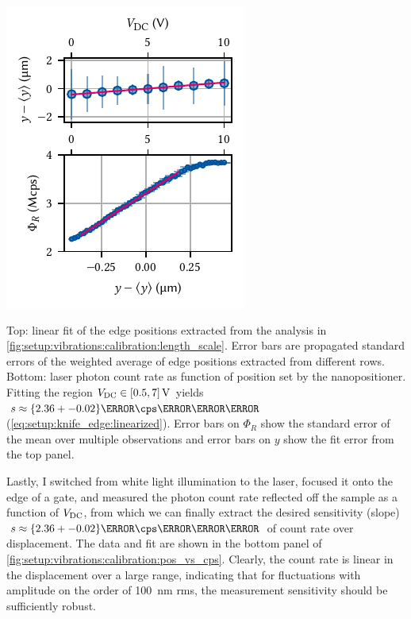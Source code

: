 \begin{marginfigure}
    \centering
    \includegraphics{img/pdf/setup/knife_edge_fits}
    \caption[]{
        Top: linear fit of the edge positions extracted from the analysis in \cref{fig:setup:vibrations:calibration:length_scale}.
        Error bars are propagated standard errors of the weighted average of edge positions extracted from different rows.
        Bottom: laser photon count rate as function of position set by the nanopositioner.
        Fitting the region $V_{\mr{DC}}\in[0.5, 7]\,\unit{\volt}$ yields $s\approx\qty{2.36+-0.02}{\mega\cps\per\micro\meter}$ (\cf \cref{eq:setup:knife_edge:linearized}).
        Error bars on $\Phi_R$ show the standard error of the mean over multiple observations and error bars on $y$ show the fit error from the top panel.
    }
    \label{fig:setup:vibrations:calibration:pos_vs_cps}
\end{marginfigure}

Lastly, I switched from white light illumination to the laser, focused it onto the edge of a gate, and measured the photon count rate reflected off the sample as a function of $V_{\mathrm{DC}}$, from which we can finally extract the desired sensitivity (slope) $s\approx\qty{2.36+-0.02}{\mega\cps\per\micro\meter}$ of count rate over displacement.
The data and fit are shown in the bottom panel of \cref{fig:setup:vibrations:calibration:pos_vs_cps}.
Clearly, the count rate is linear in the displacement over a large range, indicating that for fluctuations with amplitude on the order of \qty{100}{\nano\meter} \gls{rms}, the measurement sensitivity should be sufficiently robust.

